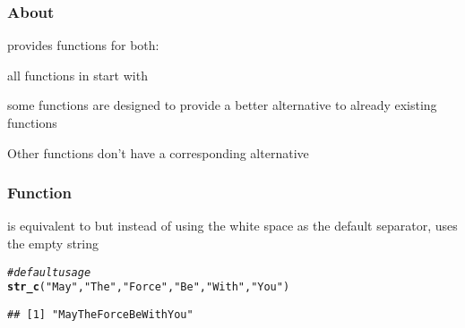 \documentclass[12pt]{beamer}\usepackage[]{graphicx}\usepackage[]{color}
\makeatletter
\newcommand{\hlstr}[1]{\textcolor[rgb]{0.192,0.494,0.8}{#1}}%
\newcommand{\hlcom}[1]{\textcolor[rgb]{0.678,0.584,0.686}{\textit{#1}}}%
\newcommand{\hlstd}[1]{\textcolor[rgb]{0.345,0.345,0.345}{#1}}%
\newcommand{\hlkwd}[1]{\textcolor[rgb]{0.737,0.353,0.396}{\textbf{#1}}}%
\newenvironment{kframe}{%
 \def\at@end@of@kframe{}%
 \ifinner\ifhmode%
  \def\at@end@of@kframe{\end{minipage}}%
  \begin{minipage}{\columnwidth}%
 \fi\fi%
 \def\FrameCommand##1{\hskip\@totalleftmargin \hskip-\fboxsep
 \colorbox{shadecolor}{##1}\hskip-\fboxsep
     \hskip-\linewidth \hskip-\@totalleftmargin \hskip\columnwidth}%
 \MakeFramed {\advance\hsize-\width
   \@totalleftmargin\z@ \linewidth\hsize
   \@setminipage}}%
 {\par\unskip\endMakeFramed%
 \at@end@of@kframe}
\newenvironment{knitrout}{}{} %
\makeatother
\begin{document}

\begin{frame}
\frametitle{About }

 provides functions for both:
\bi
  \item all functions in  start with {\hilit {}}
  \item some functions are designed to provide a better alternative to already existing functions
  \item Other functions don't have a corresponding alternative
\ei

\end{frame}


\begin{frame}[fragile]
\frametitle{Function }

 is equivalent to  but instead of using the white space as the default separator,  uses the empty string 
\begin{knitrout}\footnotesize
{}\color{fgcolor}\begin{kframe}
\begin{alltt}
\hlcom{# default usage}
\hlkwd{str_c}\hlstd{(}\hlstr{"May"}\hlstd{,} \hlstr{"The"}\hlstd{,} \hlstr{"Force"}\hlstd{,} \hlstr{"Be"}\hlstd{,} \hlstr{"With"}\hlstd{,} \hlstr{"You"}\hlstd{)}
\end{alltt}
\begin{verbatim}
## [1] "MayTheForceBeWithYou"
\end{verbatim}
\end{kframe}
\end{knitrout}

\end{frame}

\end{document}
